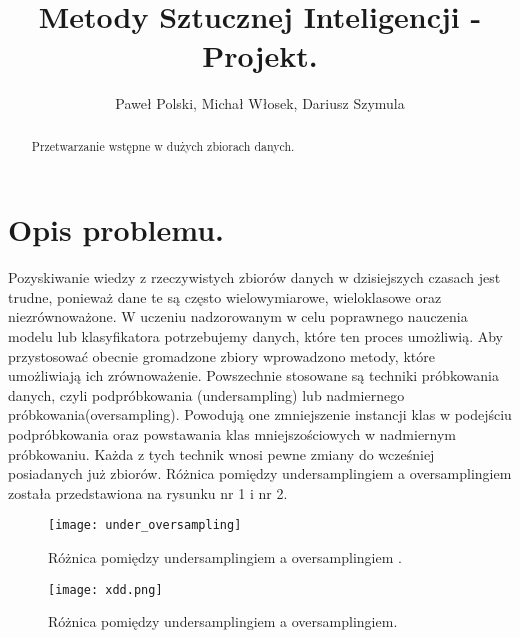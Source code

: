 \documentclass{article}
\begin{document}
\title{Metody Sztucznej Inteligencji - Projekt.}


\author{Paweł Polski, Michał Włosek, Dariusz Szymula}


\maketitle      
\begin{abstract}
\begin{center}
    Przetwarzanie wstępne w dużych zbiorach danych.
\end{center}
\end{abstract}



%
\section{Opis problemu.}
Pozyskiwanie wiedzy z rzeczywistych zbiorów danych w dzisiejszych czasach jest trudne, ponieważ dane te są często wielowymiarowe, wieloklasowe oraz niezrównoważone. W uczeniu nadzorowanym w celu poprawnego nauczenia modelu lub klasyfikatora potrzebujemy danych, które ten proces umożliwią. Aby przystosować obecnie gromadzone zbiory wprowadzono metody, które umożliwiają ich zrównoważenie. 
\cite{inproceedingss}
Powszechnie stosowane są techniki próbkowania danych, czyli podpróbkowania (undersampling) lub nadmiernego próbkowania(oversampling)\cite{4717268}. Powodują one zmniejszenie instancji klas w podejściu podpróbkowania oraz powstawania klas mniejszościowych w nadmiernym próbkowaniu. Każda z tych technik wnosi pewne zmiany do wcześniej posiadanych już zbiorów. Różnica pomiędzy undersamplingiem a oversamplingiem została przedstawiona na rysunku nr 1 i nr 2.



\begin{figure}[h!]
\texttt{[image: under\_oversampling]}
\caption{Różnica pomiędzy undersamplingiem a oversamplingiem \cite{inproceedingss}.} 
\label{fig:under_oversampling}
\end{figure}
\break 
\begin{figure}[h!]
\texttt{[image: xdd.png]}
\caption{Różnica pomiędzy undersamplingiem a oversamplingiem\cite{8982391}.} 
\label{fig:underoversampling}
\end{figure}
\end{document}
